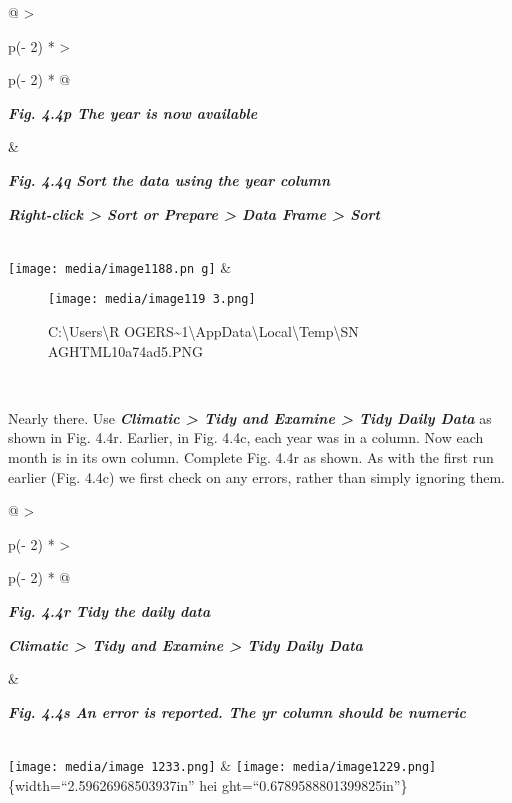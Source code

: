 \documentclass[
  letterpaper,
  DIV=11,
  numbers=noendperiod]{scrreprt}
\begin{document}
\begin{longtable}[]{@{}
  >{\raggedright\arraybackslash}p{(\columnwidth - 2\tabcolsep) * }
  >{\raggedright\arraybackslash}p{(\columnwidth - 2\tabcolsep) * }@{}}
\toprule\noalign{}
\begin{minipage}[b]{\linewidth}\raggedright
\textbf{\emph{Fig. 4.4p The year is now available}}
\end{minipage} & \begin{minipage}[b]{\linewidth}\raggedright
\textbf{\emph{Fig. 4.4q Sort the data using the year column}}

\textbf{\emph{Right-click \textgreater{} Sort or Prepare \textgreater{}
Data Frame \textgreater{} Sort}}
\end{minipage} \\
\midrule\noalign{}
\endhead
\bottomrule\noalign{}
\endlastfoot
\texttt{[image: media/image1188.pn g]}
& \begin{minipage}[t]{\linewidth}\raggedright
\begin{figure}[H]

{\centering \texttt{[image: media/image119 3.png]}

}

\caption{C:\textbackslash Users\textbackslash R
OGERS\textasciitilde1\textbackslash AppData\textbackslash Local\textbackslash Temp\textbackslash SN
AGHTML10a74ad5.PNG}

\end{figure}%
\end{minipage} \\
\end{longtable}

Nearly there. Use \textbf{\emph{Climatic \textgreater{} Tidy and Examine
\textgreater{} Tidy Daily Data}} as shown in Fig. 4.4r. Earlier, in Fig.
4.4c, each year was in a column. Now each month is in its own column.
Complete Fig. 4.4r as shown. As with the first run earlier (Fig. 4.4c)
we first check on any errors, rather than simply ignoring them.

\begin{longtable}[]{@{}
  >{\raggedright\arraybackslash}p{(\columnwidth - 2\tabcolsep) * }
  >{\raggedright\arraybackslash}p{(\columnwidth - 2\tabcolsep) * }@{}}
\toprule\noalign{}
\begin{minipage}[b]{\linewidth}\raggedright
\textbf{\emph{Fig. 4.4r Tidy the daily data}}

\textbf{\emph{Climatic \textgreater{} Tidy and Examine \textgreater{}
Tidy Daily Data}}
\end{minipage} & \begin{minipage}[b]{\linewidth}\raggedright
\textbf{\emph{Fig. 4.4s An error is reported. The yr column should be
numeric}}
\end{minipage} \\
\midrule\noalign{}
\endhead
\bottomrule\noalign{}
\endlastfoot
\texttt{[image: media/image 1233.png]} &
\texttt{[image: media/image1229.png]} \{width=``2.59626968503937in'' hei
ght=``0.6789588801399825in''\} \\
\end{longtable}
\end{document}

